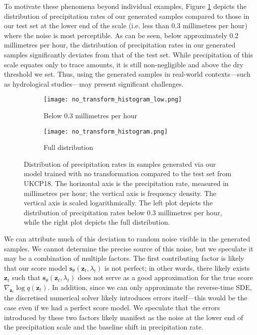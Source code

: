 \documentclass[ oneside,%
                    author={George Herbert},
                    degree={MSci},
                     title={Video Diffusion Models for Climate Simulations},
                  subtitle={}]{dissertation}
\begin{document}
To motivate these phenomena beyond individual examples, Figure \ref{fig:no_transform_histogram_low} depicts the distribution of precipitation rates of our generated samples compared to those in our test set at the lower end of the scale (i.e. less than 0.3 millimetres per hour) where the noise is most perceptible. As can be seen, below approximately 0.2 millimetres per hour, the distribution of precipitation rates in our generated samples significantly deviates from that of the test set. While precipitation of this scale equates only to trace amounts, it is still non-negligible and above the dry threshold we set. Thus, using the generated samples in real-world contexts---such as hydrological studies---may present significant challenges.

\begin{figure}[htbp]
      \centering
      \begin{subfigure}{0.49\textwidth}
            \texttt{[image: no\_transform\_histogram\_low.png]}
            \caption{Below 0.3 millimetres per hour}
            \label{fig:no_transform_histogram_low}
      \end{subfigure}
      \begin{subfigure}{0.49\textwidth}
            \texttt{[image: no\_transform\_histogram.png]}
            \caption{Full distribution}
            \label{fig:no_transform_histogram_high}
      \end{subfigure}
      \caption{Distribution of precipitation rates in samples generated via our model trained with no transformation compared to the test set from UKCP18. The horizontal axis is the precipitation rate, measured in millimetres per hour; the vertical axis is frequency density. The vertical axis is scaled logarithmically. The left plot depicts the distribution of precipitation rates below 0.3 millimetres per hour, while the right plot depicts the full distribution.}
      \label{fig:no_transform_histogram}
\end{figure}

We can attribute much of this deviation to random noise visible in the generated samples. We cannot determine the precise source of this noise, but we speculate it may be a combination of multiple factors. The first contributing factor is likely that our score model $\mathbf{s}_\theta(\mathbf{z}_t, \lambda_t)$ is not perfect; in other words, there likely exists $\mathbf{z}_t$ such that $\mathbf{s}_\theta(\mathbf{z}_t, \lambda_t)$ does not serve as a good approximation for the true score $\nabla_{\mathbf{z}_t}  \log q(\mathbf{z}_t)$. In addition, since we can only approximate the reverse-time SDE, the discretised numerical solver likely introduces errors itself---this would be the case even if we had a perfect score model. We speculate that the errors introduced by these two factors likely manifest as the noise at the lower end of the precipitation scale and the baseline shift in precipitation rate.
\end{document}
